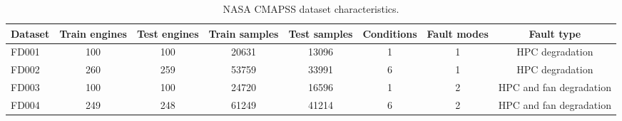 \begin{table}[!t]
\centering
\caption{NASA CMAPSS dataset characteristics.}
\label{tab:dataset\_characteristics}
\begin{tabular}{lccccccc}
\hline
Dataset & Train engines & Test engines & Train samples & Test samples & Conditions & Fault modes & Fault type \\
\hline
FD001 & 100 & 100 & 20631 & 13096 & 1 & 1 & HPC degradation \\
FD002 & 260 & 259 & 53759 & 33991 & 6 & 1 & HPC degradation \\
FD003 & 100 & 100 & 24720 & 16596 & 1 & 2 & HPC and fan degradation \\
FD004 & 249 & 248 & 61249 & 41214 & 6 & 2 & HPC and fan degradation \\
\hline
\end{tabular}
\end{table}

